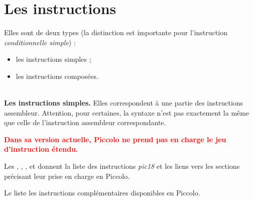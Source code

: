\section{Les instructions}

Elles sont de deux types (la distinction est importante pour l’instruction \emph{conditionnelle simple}) :
\begin{itemize}
  \item les instructions simples ;
  \item les instructions composées.

\end{itemize}


~\\
\textbf{Les instructions simples.} Elles correspondent à une partie des instructions assembleur. Attention, pour certaines, la syntaxe n'est pas exactement la même que celle de l'instruction assembleur correspondante.

\textcolor{red}{\bf Dans sa version actuelle, Piccolo ne prend pas en charge le jeu d'instruction étendu.}

Les , , ,  et  donnent la liste des instructions \emph{pic18} et les liens vers les sections précisant leur prise en charge en Piccolo.

Le  liste les instructions complémentaires disponibles en Piccolo.
 
